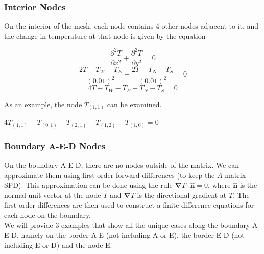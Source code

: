 \documentclass[12pt,a4paper]{article}
\begin{document}
\subsubsection{Interior Nodes}
On the interior of the mesh, each node contains 4 other nodes adjacent to it, and the change in temperature at that node is given by the equation
\begin{center}
\[\frac{\partial^2 T}{\partial x^2}+\frac{\partial^2 T}{\partial y^2}=0\]
\[\frac{2T-T_W-T_E}{(0.01)^2}+\frac{2T-T_N-T_S}{(0.01)^2}=0\]
\[4T-T_W-T_E-T_N-T_S=0\]
\end{center}
\begin{center}
\end{center}
As an example, the node $T_{(1,1)}$ can be examined.
\begin{center}
  $4T_{(1,1)}-T_{(0,1)}-T_{(2,1)}-T_{(1,2)}-T_{(1,0)}=0$
\end{center}
\subsubsection{Boundary A-E-D Nodes}
On the boundary A-E-D, there are no nodes outside of the matrix. We can approximate them using first order forward differences (to keep the $A$ matrix SPD). This approximation can be done using the rule $\boldsymbol{\nabla} T \cdot {\hat{\textbf{n}}} = 0$, where ${\hat{\textbf{n}}}$ is the normal unit vector at the node $T$ and $\boldsymbol{\nabla} T$ is the directional gradient at $T$. The first order differences are then used to construct a finite difference equations for each node on the boundary.\\We will provide 3 examples that show all the unique cases along the boundary A-E-D, namely on the border A-E (not including A or E), the border E-D (not including E or D) and the node E.
\end{document}
